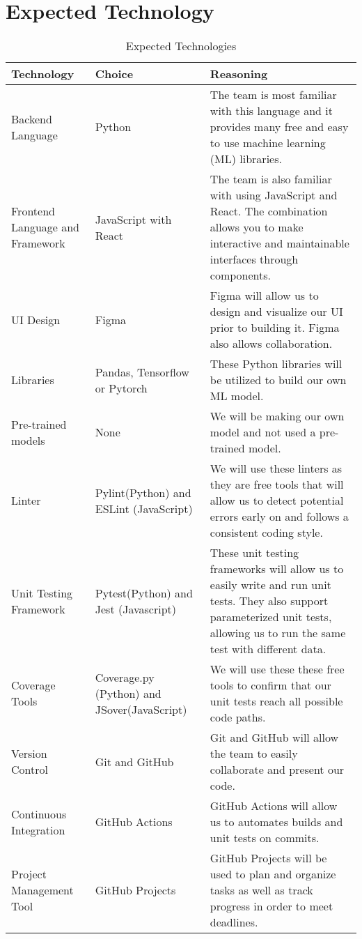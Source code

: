 \documentclass{article}
\begin{document}
\section{Expected Technology}
\begin{table}[!htbp]
  \caption{Expected Technologies}
  \begin{tabular}{|p{4cm}|p{4cm}|p{5cm}|}
  \hline
  \textbf{Technology} & \textbf{Choice} & \textbf{Reasoning} \\ 
  \hline
  Backend Language & Python & The team is most familiar with this language and it provides many free and easy to use machine learning (ML) libraries.\\
  \hline 
  Frontend Language and Framework & JavaScript with React & The team is also familiar with using JavaScript and React. The combination allows you to make interactive and maintainable interfaces through components. \\
  \hline
  UI Design & Figma & Figma will allow us to design and visualize our UI prior to building it. Figma also allows collaboration.\\ 
  \hline
  Libraries & Pandas, Tensorflow or Pytorch & These Python libraries will be utilized to build our own ML model. \\
  \hline
  Pre-trained models & None & We will be making our own model and not used a pre-trained model.\\
  \hline 
  Linter & Pylint(Python) and ESLint (JavaScript) &  We will use these linters as they are free tools that will allow us to detect potential errors early on and follows a consistent coding style. \\
  \hline
  Unit Testing Framework & Pytest(Python) and Jest (Javascript) & These unit testing frameworks will allow us to easily write and run unit tests. \newline They also support parameterized unit tests, allowing us to run the same test with different data. \\
  \hline
  Coverage Tools & Coverage.py (Python) and JSover(JavaScript) & We will use these these free tools to confirm that our unit tests reach all possible code paths.\\
  \hline
  Version Control & Git and GitHub & Git and GitHub will allow the team to easily collaborate and present our code. \\
  \hline 
  Continuous Integration & GitHub Actions & GitHub Actions will allow us to automates builds and unit tests on commits. \\
  \hline 
  Project Management Tool & GitHub Projects & GitHub Projects will be used to plan and organize tasks as well as track progress in order to meet deadlines.\\
  \hline 

\end{tabular}

\end{table}
\end{document}
